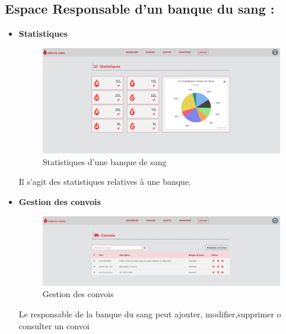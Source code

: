 \documentclass[12pt,a4paper,twoside]{report}
\begin{document}
{		\subsection{Espace Responsable d'un banque du sang :}{
			\begin{itemize}
					\item \textbf{Statistiques}
					\begin{figure}[H]
									 \includegraphics[width=13cm]{Images/statBS.png}
									 \centering
									 \caption{\label{statBS} Statistiques d'une banque de sang}
								\end{figure}
					Il s'agit des statistiques relatives à une banque.
					\newline
					\item \textbf{Gestion des convois}
					\begin{figure}[H]
									 \includegraphics[width=13cm]{Images/convoi.png}
									 \centering
									 \caption{\label{convoi} Gestion des convois}
								\end{figure}
								Le responsable de la banque du sang peut ajouter, modifier,supprimer o consulter un convoi
								

\end{itemize}}}
\end{document}
